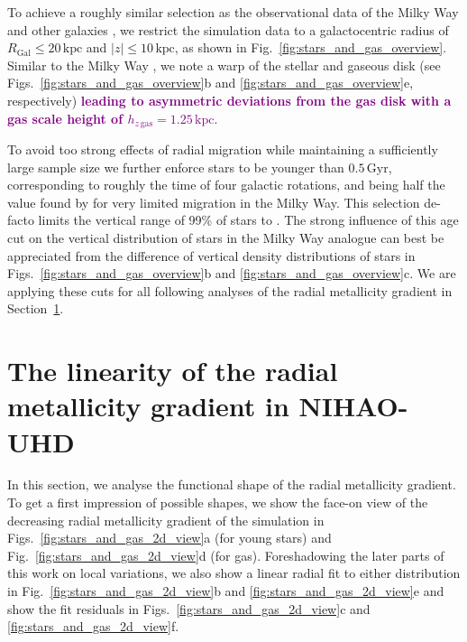 \documentclass[twocolumn,apj,numberedappendix,appendixfloats,twocolappendix]{openjournal}
\newcommand{\adjusted}[1]{\textbf{\textcolor{purple}{#1}}}
\newcommand{\nihaoAGEmax}{$0.5\,\mathrm{Gyr}$}
\begin{document}
\begin{CJK*}{UTF8}{gbsn}
To achieve a roughly similar selection as the observational data of the Milky Way \citep{Genovali2014} and other galaxies \citep[e.g.][]{Chen2023}, we restrict the simulation data to a galactocentric radius of $R_\mathrm{Gal} \leq 20\,\mathrm{kpc}$ and $\vert z \vert \leq 10\,\mathrm{kpc}$, as shown in Fig.~\ref{fig:stars_and_gas_overview}. Similar to the Milky Way \citep{Poggio2018, Lemasle2022}, we note a warp of the stellar and gaseous disk (see Figs.~\ref{fig:stars_and_gas_overview}b and \ref{fig:stars_and_gas_overview}e, respectively) \adjusted{ leading to asymmetric deviations from the gas disk with a gas scale height of $h_{z\,\mathrm{gas}} = 1.25\,\mathrm{kpc}$}.

To avoid too strong effects of radial migration \citep{Binney2008, Frankel2018, Grand2016, Minchev2018} while maintaining a sufficiently large sample size we further enforce stars to be younger than \nihaoAGEmax, corresponding to roughly the time of four galactic rotations, and being half the value found by \citet{Minchev2018} for very limited migration in the Milky Way. This selection de-facto limits the vertical range of 99\% of stars to . The strong influence of this age cut on the vertical distribution of stars in the Milky Way analogue can best be appreciated from the difference of vertical density distributions of stars in Figs.~\ref{fig:stars_and_gas_overview}b and \ref{fig:stars_and_gas_overview}c. We are applying these cuts for all following analyses of the radial metallicity gradient in Section~\ref{sec:linear_radial_metallicity_gradients}.


\section{The linearity of the radial metallicity gradient in NIHAO-UHD}
\label{sec:linear_radial_metallicity_gradients}

In this section, we analyse the functional shape of the radial metallicity gradient. To get a first impression of possible shapes, we show the face-on view of the decreasing radial metallicity gradient of the simulation in Figs.~\ref{fig:stars_and_gas_2d_view}a (for young stars) and Fig.~\ref{fig:stars_and_gas_2d_view}d (for gas). Foreshadowing the later parts of this work on local variations, we also show a linear radial fit to either distribution in Fig.~\ref{fig:stars_and_gas_2d_view}b and \ref{fig:stars_and_gas_2d_view}e and show the fit residuals in Figs.~\ref{fig:stars_and_gas_2d_view}c and \ref{fig:stars_and_gas_2d_view}f.


\end{CJK*}
\end{document}

